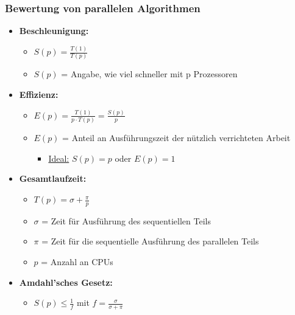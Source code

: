 		\newpage
		\subsubsection{Bewertung von parallelen Algorithmen}
					
			\begin{itemize}
				\item \textbf{Beschleunigung:}
				\begin{itemize}
					\item {\LARGE ${S}{\left(p\right)}=\frac{T\left(1\right)}{T\left(p\right)}$}
					\item ${S}{\left(p\right)}$ = Angabe, wie viel schneller mit p Prozessoren
				\end{itemize}
				\item \textbf{Effizienz:}
				\begin{itemize}
					\item {\LARGE ${E}{\left(p\right)}=\frac{T\left(1\right)}{p\cdot T\left(p\right)}=\frac{{S}{\left(p\right)}}{p}$}
					\item ${E}{\left(p\right)}$ = Anteil an Ausführungszeit der nützlich verrichteten Arbeit
					\begin{itemize}
						\item \underline{Ideal:} ${S}{\left(p\right)} = {p}$ oder ${E}{\left(p\right)} = {1}$
					\end{itemize}
				\end{itemize}
				\item \textbf{Gesamtlaufzeit:}
				\begin{itemize}
					\item {\LARGE ${T}{\left(p\right)} = \sigma + \frac{\pi}{{p}}$}
					\item $\sigma$ = Zeit für Ausführung des sequentiellen Teils
					\item $\pi$ = Zeit für die sequentielle Ausführung des parallelen Teils
					\item ${p}$ = Anzahl an CPUs
				\end{itemize}
				\item \textbf{Amdahl'sches Gesetz:}
				\begin{itemize}
					\item {\LARGE ${S}{\left(p\right)} \le \frac{1}{f}$} mit {\LARGE ${f} = \frac{\sigma}{\sigma + \pi}$}
				\end{itemize}
			\end{itemize}
